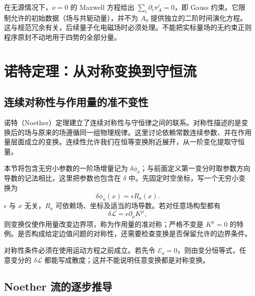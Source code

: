 在无源情况下，$\nu=0$ 的 Maxwell 方程给出
$\sum_{i}\partial_{i}\pi_{A}^{i}=0$，即 Gauss 约束。它限制允许的初始数据（场与共轭动量），并不为 $A_{0}$ 提供独立的二阶时间演化方程。这与规范冗余有关，后续量子化电磁场时必须处理。不能把实标量场的无约束正则程序原封不动地用于四势的全部分量。

\section{诺特定理：从对称变换到守恒流}
\label{sec:prelude-noether}

\subsection{连续对称性与作用量的准不变性}

诺特（Noether）定理建立了连续对称性与守恒律之间的联系。对称性描述的是变换后的场与原来的场遵循同一组物理规律。这里讨论依赖常数连续参数、并在作用量层面成立的变换。连续性允许我们在恒等变换附近展开，从一阶变化提取守恒量。

本节将包含无穷小参数的一阶场增量记为 $\delta\phi_{a}$；与前面定义第一变分时取参数方向导数的记法相比，这里把参数也包含在 $\delta$ 中。先固定时空坐标，写一个无穷小变换为
\begin{equation}
  \delta\phi_{a}(x)=\epsilon R_{a}(x).
\end{equation}
$\epsilon$ 与 $x$ 无关，$R_{a}$ 可依赖场、坐标及适当的场导数。若对任意场构型都有
\begin{equation}
  \delta\mathcal{L}=\epsilon\partial_{\mu}K^{\mu},
  \label{eq:prelude-quasisymmetry}
\end{equation}
则变换仅使作用量改变边界项，称为作用量的准对称；严格不变是 $K^{\mu}=0$ 的特例。是否构成给定边值问题的对称性，还需要检查变换是否保留允许的边界条件。

对称性条件必须在使用运动方程之前成立。若先令 $\mathcal{E}_{a}=0$，则由变分恒等式，任意变分的 $\delta\mathcal{L}$ 都能写成散度；这并不能说明任意变换都是对称变换。

\subsection{Noether 流的逐步推导}

